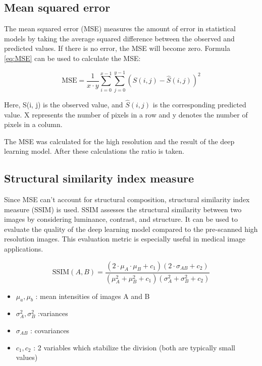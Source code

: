 \documentclass[twocolumn]{article}
\begin{document}
\subsection{Mean squared error}
The mean squared error (MSE) measures the amount of error in statistical models by taking the average squared difference between the observed and predicted values. If there is no error, the MSE will become zero. Formula \ref{eq:MSE} can be used to calculate the MSE: 

\begin{equation}\label{eq:MSE}
    \text{MSE} = \frac{1}{x \cdot y} \sum_{i=0}^{x-1} \sum_{j=0}^{y-1} \left( S(i, j) - \hat{S}(i, j) \right)^2
\end{equation}

Here, S(i, j) is the observed value, and $\hat{S}(i, j)$  is the corresponding predicted value. X represents the number of pixels in a row and y denotes the number of pixels in a column. \cite{mseJim}

The MSE was calculated for the high resolution and the result of the deep learning model. After these calculations the ratio is taken.

\subsection{Structural similarity index measure}
Since MSE can't account for structural composition, structural similarity index measure (SSIM) is used. SSIM assesses the structural similarity between two images by considering luminance, contrast, and structure. It can be used to evaluate the quality of the deep learning model compared to the pre-scanned high resolution images. This evaluation metric is especially useful in medical image applications.

\begin{equation}\label{eq:SSIM}
\text{SSIM}(A, B) = \frac{(2 \cdot \mu_A \cdot \mu_B + c_1)(2 \cdot \sigma_{AB} + c_2)}{(\mu_A^2 + \mu_B^2 + c_1)(\sigma_A^2 + \sigma_B^2 + c_2)}
\end{equation}

\begin{itemize}
    \item $\mu_a,\mu_b$ : mean intensities of images A and B
    \item $\sigma_A^2, \sigma_B^2$ :variances
    \item $\sigma_{AB}$ : covariances
    \item $c_1,c_2$ : 2 variables which stabilize the division (both are typically small values)
\end{itemize}
\end{document}
